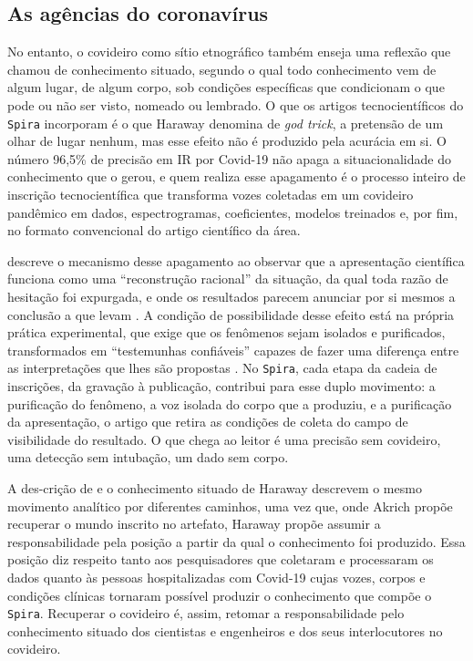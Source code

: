 \subsection{As agências do coronavírus}
\label{subsec:situar_pessoas}

No entanto, o covideiro como sítio etnográfico também enseja uma reflexão que \textcite{Haraway1991Situated} chamou de conhecimento situado, segundo o qual todo conhecimento vem de algum lugar, de algum corpo, sob condições específicas que condicionam o que pode ou não ser visto, nomeado ou lembrado. O que os artigos tecnocientíficos do \texttt{Spira} incorporam é o que Haraway denomina de \textit{god trick}, a pretensão de um olhar de lugar nenhum, mas esse efeito não é produzido pela acurácia em si. O número 96,5\% de precisão em IR por Covid-19 não apaga a situacionalidade do conhecimento que o gerou, e quem realiza esse apagamento é o processo inteiro de inscrição tecnocientífica que transforma vozes coletadas em um covideiro pandêmico em dados, espectrogramas, coeficientes, modelos treinados e, por fim, no formato convencional do artigo científico da área.

\textcite{stengers2018another} descreve o mecanismo desse apagamento ao observar que a apresentação científica funciona como uma \enquote{reconstrução racional} da situação, da qual toda razão de hesitação foi expurgada, e onde os resultados parecem anunciar por si mesmos a conclusão a que levam \parencite[p.~2]{stengers2018another}. A condição de possibilidade desse efeito está na própria prática experimental, que exige que os fenômenos sejam isolados e purificados, transformados em \enquote{testemunhas confiáveis} capazes de fazer uma diferença entre as interpretações que lhes são propostas \parencite[pp.~49--50]{stengers2010cosmopolitics1}. No \texttt{Spira}, cada etapa da cadeia de inscrições, da gravação à publicação, contribui para esse duplo movimento: a purificação do fenômeno, a voz isolada do corpo que a produziu, e a purificação da apresentação, o artigo que retira as condições de coleta do campo de visibilidade do resultado. O que chega ao leitor é uma precisão sem covideiro, uma detecção sem intubação, um dado sem corpo.

A des-crição de \textcite{Akrich1992Description} e o conhecimento situado de Haraway descrevem o mesmo movimento analítico por diferentes caminhos, uma vez que, onde Akrich propõe recuperar o mundo inscrito no artefato, Haraway propõe assumir a responsabilidade pela posição a partir da qual o conhecimento foi produzido. Essa posição diz respeito tanto aos pesquisadores que coletaram e processaram os dados quanto às pessoas hospitalizadas com Covid-19 cujas vozes, corpos e condições clínicas tornaram possível produzir o conhecimento que compõe o \texttt{Spira}. Recuperar o covideiro é, assim, retomar a responsabilidade pelo conhecimento situado dos cientistas e engenheiros e dos seus interlocutores no covideiro.

